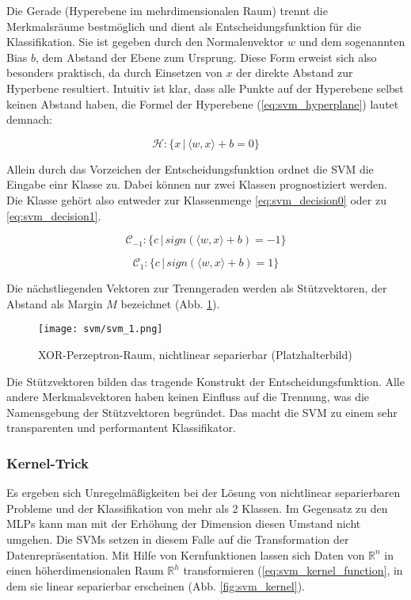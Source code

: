Die Gerade (Hyperebene im mehrdimensionalen Raum) trennt die Merkmalsräume bestmöglich und dient als Entscheidungsfunktion für die Klassifikation. Sie ist gegeben durch den Normalenvektor $w$ und dem sogenannten Bias $b$, dem Abstand der Ebene zum Ursprung. Diese Form erweist sich also besonders praktisch, da durch Einsetzen von $x$ der direkte Abstand zur Hyperbene resultiert.
Intuitiv ist klar, dass alle Punkte auf der Hyperebene selbst keinen Abstand haben, die Formel der Hyperebene (\ref{eq:svm_hyperplane}) lautet demnach: 
 
\begin{equation}
\label{eq:svm_hyperplane}
    \mathcal{H}: \{ x \,|\, \langle w,x \rangle + b = 0 \}
\end{equation}
 
Allein durch das Vorzeichen der Entscheidungsfunktion ordnet die SVM die Eingabe einr Klasse zu. Dabei können nur zwei Klassen  prognostiziert werden. Die Klasse gehört also entweder zur Klassenmenge \ref{eq:svm_decision0} oder zu \ref{eq:svm_decision1}.

\begin{equation}
\label{eq:svm_decision0}
    \mathcal{C}_{-1}: \{ c \,|\, sign(\langle w,x \rangle + b) = -1 \}
\end{equation}

\begin{equation}
\label{eq:svm_decision1}
    \mathcal{C}_1: \{ c \,|\, sign(\langle w,x \rangle + b) = 1 \}
\end{equation}

Die nächstliegenden Vektoren zur Trenngeraden werden als Stützvektoren, der Abstand als Margin $M$ bezeichnet (Abb. \ref{fig:svm_separator}). 

\begin{figure}[htbp] \centering
    \texttt{[image: svm/svm\_1.png]}
    \caption{XOR-Perzeptron-Raum, nichtlinear separierbar (Platzhalterbild)}
    \label{fig:svm_separator}
\end{figure}

Die Stützvektoren bilden das tragende Konstrukt der Entscheidungsfunktion. 
Alle andere Merkmalsvektoren haben keinen Einfluss auf die Trennung, was die Namensgebung der Stützvektoren begründet. 
Das macht die SVM zu einem sehr transparenten und performantent Klassifikator. 


\subsubsection{Kernel-Trick}
Es ergeben sich Unregelmäßigkeiten bei der Lösung von nichtlinear separierbaren Probleme und der Klassifikation von mehr als 2 Klassen.
Im Gegensatz zu den MLPs kann man mit der Erhöhung der Dimension diesen Umstand nicht umgehen. 
Die SVMs setzen in diesem Falle auf die Transformation der Datenrepräsentation. 
Mit Hilfe von Kernfunktionen lassen sich Daten von $\mathbb{R}^n$ in einen höherdimensionalen Raum $\mathbb{R}^h$ transformieren (\ref{eq:svm_kernel_function}, in dem sie linear separierbar erscheinen (Abb. \ref{fig:svm_kernel}). 

